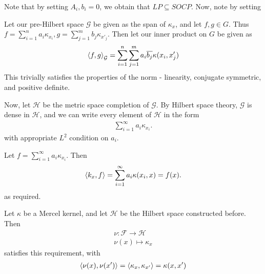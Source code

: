 \begin{exercises}
  Note that by setting $A_{i}, b_{i} = 0$, we obtain that $LP \subseteq
  SOCP$.  Now, note by setting 
\item
\item
\item
\item
\item
  Let our pre-Hilbert space $\mathcal{G}$ be given as the span of $\kappa_{x}$,
  and let $f, g \in G$.  Thus $f = \sum_{i=1}^{n} a_{i} \kappa_{x_{i}}, g
  = \sum_{j=1}^{m} b_{j} \kappa_{x'_{j}}$.  Then let our inner product
  on $G$ be given as
  \begin{align}
    \label{eq:46}
    \IP{f, g}_{\mathcal{G}} = \sum_{i=1}^{n} \sum_{j=1}^{m} a_{i}
    \overline{b_{j}} \kappa(x_{i}, x'_{j})
  \end{align}  This trivially satisfies the properties of the norm -
  linearity, conjugate symmetric, and positive definite.

  Now, let $\mathcal{H}$ be the metric space completion of
  $\mathcal{G}$.  By Hilbert space theory, $\mathcal{G}$ is dense in
  $\mathcal{H}$, and we can write every element of $\mathcal{H}$ in
  the form
  \begin{align}
    \label{eq:47}
    \sum_{i=1}^{\infty} a_{i} \kappa_{x_{i}}.
  \end{align} with appropriate $L^{2}$ condition on $a_{i}$.

  Let $f = \sum_{i=1}^{\infty} a_{i} \kappa_{x_{i}}$.  Then
  \begin{align}
    \label{eq:48}
    \IP{k_{x}, f} = \sum_{i=1}^{\infty} a_{i} \kappa(x_{i}, x) = f(x).
  \end{align} as required.

  Let $\kappa$ be a Mercel kernel, and let $\mathcal{H}$ be the
  Hilbert space constructed before.  Then
  \begin{align}
    \label{eq:49}
    \nu : \mathcal{F} \rightarrow \mathcal{H} \\
    \nu(x) \mapsto \kappa_{x}
  \end{align} satisfies this requirement, with
  \begin{align}
    \label{eq:50}
    \IP{\nu(x), \nu(x')} = \IP{\kappa_{x}, \kappa_{x'}} = \kappa(x, x')
  \end{align}
\end{exercises}


